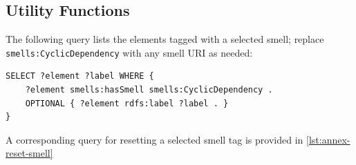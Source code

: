 \subsection{Utility Functions}
\label{subsec:utility-functions}

The following query lists the elements tagged with a selected smell; replace
\texttt{smells:CyclicDependency} with any smell URI as needed:

\begin{lstlisting}[caption={View tagged elements for a specific smell}]
SELECT ?element ?label WHERE {
    ?element smells:hasSmell smells:CyclicDependency .
    OPTIONAL { ?element rdfs:label ?label . }
}
\end{lstlisting}

A corresponding query for resetting a selected smell tag is provided in \autoref{lst:annex-reset-smell}
